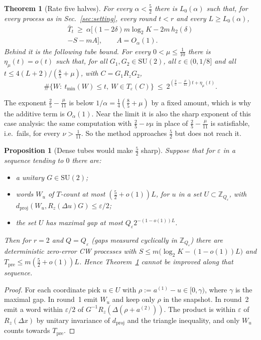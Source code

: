 \documentclass[aps,prx,twocolumn,superscriptaddress,nofootinbib,longbibliography]{revtex4-2}
\theoremstyle{plain}
\newtheorem{theorem}{Theorem}
\newtheorem{proposition}{Proposition}
\theoremstyle{definition}
\theoremstyle{remark}
\newcommand{\dproj}{d_{\mathrm{proj}}}
\newcommand{\Tpre}{T_{\mathrm{pre}}}
\newcommand{\Z}{\mathbb{Z}}
\newcommand{\SU}{\mathrm{SU}(2)}
\begin{document}
\begin{theorem}[Rate five halves]\label{thm:rate52}
For every $\alpha<\tfrac52$ there is $L_0(\alpha)$ such that, for every process as in Sec.~\ref{sec:setting}, every round $t<r$ and every $L\ge L_0(\alpha)$,
\begin{multline}\label{eq:rate52}
\bar T_t\ \ge\ \alpha\big[(1-2\delta)m\log_2K-2m\,h_2(\delta)\\-S-mA\big],\qquad A=O_\alpha(1).
\end{multline}
Behind it is the following tube bound. For every $0<\mu\le\tfrac1{10}$ there is $\eta_\mu(t)=o(t)$ such that, for all $G_1,G_2\in\SU$, all $\varepsilon\in(0,1/8]$ and all $t\le4(L+2)/(\tfrac85+\mu)$, with $C=G_1R_zG_2$,
\begin{equation}\label{eq:rate52tube}
\#\{W:\ t_{\min}(W)\le t,\ W\in T_\varepsilon(C)\}\ \le\ 2^{(\frac25-\frac\mu{11})t+\eta_\mu(t)}.
\end{equation}
\end{theorem}
The exponent $\tfrac25-\tfrac\mu{11}$ is below $1/\alpha=\tfrac14(\tfrac85+\mu)$ by a fixed amount, which is why the additive term is $O_\alpha(1)$. Near the limit it is also the sharp exponent of this case analysis: the same computation with $\tfrac25-\nu\mu$ in place of $\tfrac25-\tfrac\mu{11}$ is satisfiable, i.e.\ fails, for every $\nu>\tfrac1{11}$. So the method approaches $\tfrac52$ but does not reach it.

\begin{proposition}[Dense tubes would make $\tfrac52$ sharp]\label{prop:dense}
Suppose that for $\varepsilon$ in a sequence tending to $0$ there are:
\begin{itemize}\setlength\itemsep{0pt}
\item a unitary $G\in\SU$;
\item words $W_u$ of $T$-count at most $(\tfrac52+o(1))L$, for $u$ in a set $U\subset\Z_{Q_\varepsilon}$, with $\dproj(W_u,R_z(\Delta u)G)\le\varepsilon/2$;
\item the set $U$ has maximal gap at most $Q_\varepsilon2^{-(1-o(1))L}$.
\end{itemize}
Then for $r=2$ and $Q=Q_\varepsilon$ (gaps measured cyclically in $\Z_{Q_\varepsilon}$) there are deterministic zero-error CW processes with $S\le m\big(\log_2K-(1-o(1))L\big)$ and $\Tpre\le m(\tfrac52+o(1))L$. Hence Theorem~\ref{thm:rate52} cannot be improved along that sequence.
\end{proposition}
\begin{proof}
For each coordinate pick $u\in U$ with $\rho:=a^{(1)}-u\in[0,\gamma)$, where $\gamma$ is the maximal gap. In round~1 emit $W_u$ and keep only $\rho$ in the snapshot. In round~2 emit a word within $\varepsilon/2$ of $G^{-1}R_z(\Delta(\rho+a^{(2)}))$. The product is within $\varepsilon$ of $R_z(\Delta x)$ by unitary invariance of $\dproj$ and the triangle inequality, and only $W_u$ counts towards $\Tpre$.
\end{proof}
\end{document}
